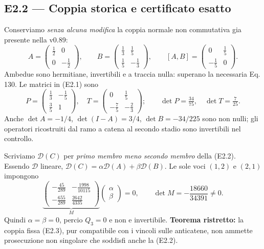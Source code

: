 \documentclass[11pt,a4paper]{article}
\begin{document}
\subsection*{E2.2 --- Coppia storica e certificato esatto}
Conserviamo \emph{senza alcuna modifica} la coppia normale non commutativa gia presente nella v0.89:
\begin{equation}
 A=\begin{pmatrix}\tfrac12&0\\0&-\tfrac12\end{pmatrix},\qquad
 B=\begin{pmatrix}\tfrac13&\tfrac15\\\tfrac15&-\tfrac13\end{pmatrix},\qquad
 [A,B]=\begin{pmatrix}0&\tfrac15\\-\tfrac15&0\end{pmatrix}.\tag{E2.3}
\end{equation}
Ambedue sono hermitiane, invertibili e a traccia nulla: superano la necessaria Eq. 130. Le matrici in (E2.1) sono
\begin{equation}
 P=\begin{pmatrix}\tfrac13&-\tfrac15\\\tfrac35&1\end{pmatrix},\quad
 T=\begin{pmatrix}0&\tfrac15\\-\tfrac75&-\tfrac23\end{pmatrix};\qquad
 \det P=\tfrac{34}{75},\quad\det T=\tfrac7{25}.\tag{E2.4}
\end{equation}
Anche $\det A=-1/4$, $\det(I-A)=3/4$, $\det B=-34/225$ sono non nulli; gli operatori ricostruiti dal ramo a catena al secondo stadio sono invertibili nel controllo.

Scriviamo $\mathcal D(C)$ per \emph{primo membro meno secondo membro} della (E2.2). Essendo $\mathcal D$ lineare, $\mathcal D(C)=\alpha\mathcal D(A)+\beta\mathcal D(B)$. Le sole voci $(1,2)$ e $(2,1)$ impongono
\begin{equation}
 \underbrace{\begin{pmatrix}-\tfrac{45}{289}&-\tfrac{1998}{10115}\\-\tfrac{655}{289}&\tfrac{2642}{4335}\end{pmatrix}}_{M}
 \begin{pmatrix}\alpha\\\beta\end{pmatrix}=0,\qquad
 \boxed{\det M=-\frac{18660}{34391}\ne0}.\tag{E2.5}
\end{equation}
Quindi $\alpha=\beta=0$, percio $Q_3=0$ e non e invertibile. \textbf{Teorema ristretto:} la coppia fissa (E2.3), pur compatibile con i vincoli sulle anticatene, non ammette prosecuzione non singolare che soddisfi anche la (E2.2).
\end{document}
